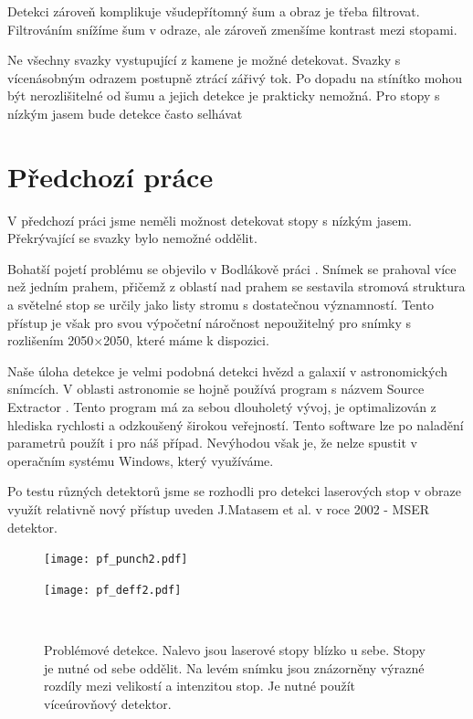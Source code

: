 Detekci zároveň komplikuje všudepřítomný šum a obraz je třeba filtrovat. Filtrováním snížíme šum v odraze, ale zároveň zmenšíme kontrast mezi stopami. 

Ne všechny svazky vystupující z kamene je možné detekovat. Svazky s vícenásobným odrazem postupně ztrácí zářivý tok. Po dopadu na stínítko mohou být nerozlišitelné od šumu a jejich detekce je prakticky nemožná. Pro stopy s nízkým jasem bude detekce často selhávat



\section{Předchozí práce}

V předchozí práci \cite{Drapela} jsme neměli možnost detekovat stopy s nízkým jasem. Překrývající se svazky bylo nemožné oddělit.  

Bohatší pojetí problému se objevilo v Bodlákově práci \cite{Bodlak2005}. Snímek se prahoval více než jedním prahem, přičemž z oblastí nad prahem se sestavila stromová struktura a světelné stop se určily jako listy stromu s dostatečnou významností. Tento přístup je však pro svou výpočetní náročnost nepoužitelný pro snímky s rozlišením 2050$\times$2050, které máme k dispozici. 

Naše úloha detekce je velmi podobná detekci hvězd a galaxií v astronomických snímcích. V oblasti astronomie se hojně používá program s názvem Source Extractor \cite{SEXarticle}. Tento program má za sebou dlouholetý vývoj, je optimalizován z hlediska rychlosti a odzkoušený širokou veřejností. Tento software lze po naladění parametrů použít i pro náš případ. Nevýhodou však je, že nelze spustit v operačním systému Windows, který využíváme.  

Po testu různých detektorů jsme se rozhodli pro detekci laserových stop v obraze využít relativně nový přístup uveden J.Matasem et al. \cite{Matas} v roce 2002 - MSER detektor. 

\begin{figure}[htbp]
    \centering
    \begin{minipage}[c]{0.48\textwidth}
        \centering\texttt{[image: pf\_punch2.pdf]}
    \end{minipage}
    \begin{minipage}[c]{0.48\textwidth}
        \centering\texttt{[image: pf\_deff2.pdf]}
    \end{minipage}
    \\
        \caption[Problémové detekce.]{Problémové detekce. Nalevo jsou laserové stopy blízko u sebe. Stopy je nutné od sebe oddělit. Na levém snímku jsou znázorněny výrazné rozdíly mezi velikostí a intenzitou stop. Je nutné použít víceúrovňový detektor. }
        \label{Detekce}
\end{figure}


